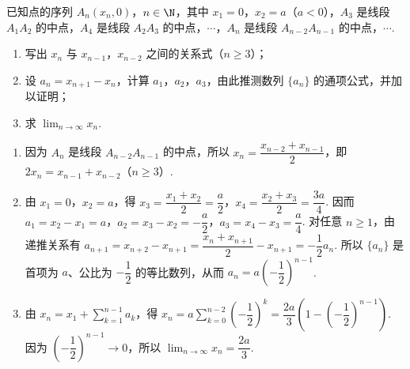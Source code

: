 \begin{problem}
已知点的序列 \(A_n(x_n,0)\)，\(n\in\N\)，其中 \(x_1=0\)，\(x_2=a\)（\(a<0\)），\(A_3\) 是线段 \(A_1A_2\) 的中点，\(A_4\) 是线段 \(A_2A_3\) 的中点，\(\cdots\)，\(A_n\) 是线段 \(A_{n-2}A_{n-1}\) 的中点，\(\cdots\).
\begin{enumerate}
\item 写出 \(x_n\) 与 \(x_{n-1}\)，\(x_{n-2}\) 之间的关系式（\(n\geqslant3\)）；
\item 设 \(a_n=x_{n+1}-x_n\)，计算 \(a_1\)，\(a_2\)，\(a_3\)，由此推测数列 \(\{a_n\}\) 的通项公式，并加以证明；
\item 求 \(\displaystyle\lim_{n\to\infty}x_n\).
\end{enumerate}

\begin{solution}
\begin{enumerate}
\item 因为 \(A_n\) 是线段 \(A_{n-2}A_{n-1}\) 的中点，所以 \(x_n=\dfrac{x_{n-2}+x_{n-1}}{2}\)，即 \(2x_n=x_{n-1}+x_{n-2}\)（\(n\geqslant3\)）.
\item 由 \(x_1=0\)，\(x_2=a\)，得 \(x_3=\dfrac{x_1+x_2}{2}=\dfrac{a}{2}\)，\(x_4=\dfrac{x_2+x_3}{2}=\dfrac{3a}{4}\). 因而 \(a_1=x_2-x_1=a\)，\(a_2=x_3-x_2=-\dfrac{a}{2}\)，\(a_3=x_4-x_3=\dfrac{a}{4}\). 对任意 \(n\geqslant1\)，由递推关系有 \(a_{n+1}=x_{n+2}-x_{n+1}=\dfrac{x_n+x_{n+1}}{2}-x_{n+1}=-\dfrac12a_n\). 所以 \(\{a_n\}\) 是首项为 \(a\)、公比为 \(-\dfrac12\) 的等比数列，从而 \(a_n=a\left(-\dfrac12\right)^{n-1}\).
\item 由 \(x_n=x_1+\displaystyle\sum_{k=1}^{n-1}a_k\)，得 \(x_n=a\displaystyle\sum_{k=0}^{n-2}\left(-\dfrac12\right)^k=\dfrac{2a}{3}\left(1-\left(-\dfrac12\right)^{n-1}\right)\). 因为 \(\left(-\dfrac12\right)^{n-1}\to0\)，所以 \(\displaystyle\lim_{n\to\infty}x_n=\dfrac{2a}{3}\).
\end{enumerate}
\end{solution}
\end{problem}

